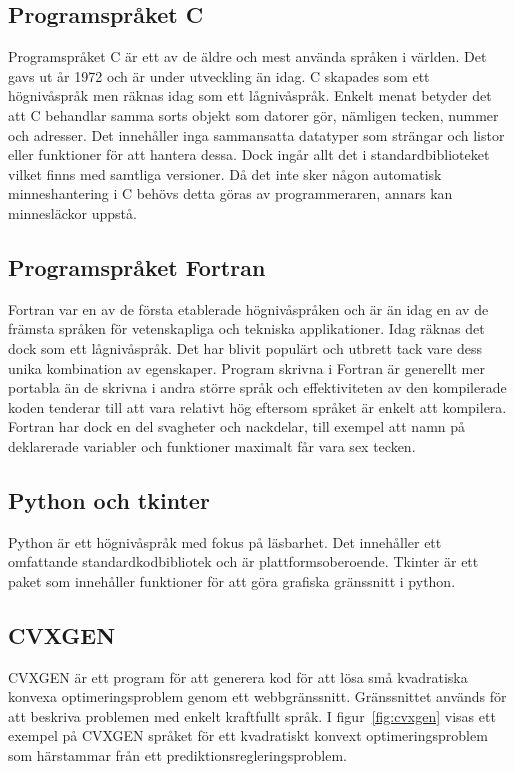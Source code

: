 \subsection{Programspråket C}
Programspråket C är ett av de äldre och mest använda språken i världen. Det gavs ut år 1972 och är under utveckling än idag. C skapades som ett högnivåspråk men räknas idag som ett lågnivåspråk. Enkelt menat betyder det att C behandlar samma sorts objekt som datorer gör, nämligen tecken, nummer och adresser. Det innehåller inga sammansatta datatyper som strängar och listor eller funktioner för att hantera dessa. Dock ingår allt det i standardbiblioteket vilket finns med samtliga versioner. Då det inte sker någon automatisk minneshantering i C behövs detta göras av programmeraren, annars kan minnesläckor uppstå. \citep{cbible}

\subsection{Programspråket Fortran}
Fortran var en av de första etablerade högnivåspråken och är än idag en av de främsta språken för vetenskapliga och tekniska applikationer. Idag räknas det dock som ett lågnivåspråk. Det har blivit populärt och utbrett tack vare dess unika kombination av egenskaper. Program skrivna i Fortran är generellt mer portabla än de skrivna i andra större språk och effektiviteten av den kompilerade koden tenderar till att vara relativt hög eftersom språket är enkelt att kompilera. Fortran har dock en del svagheter och nackdelar, till exempel att namn på deklarerade variabler och funktioner maximalt får vara sex tecken. \citep{fortran}     

\subsection{Python och tkinter}
Python är ett högnivåspråk med fokus på läsbarhet. Det innehåller ett omfattande standardkodbibliotek och är plattformsoberoende. \citep{python}  
\newline
\newline
Tkinter är ett paket som innehåller funktioner för att göra grafiska gränssnitt i python. \citep{tkinter}   

\subsection{CVXGEN}
CVXGEN är ett program för att generera kod för att lösa små kvadratiska konvexa optimeringsproblem genom ett webbgränssnitt. Gränssnittet används för att beskriva problemen med enkelt kraftfullt språk. \citep{cvxgen} \newline
\newline
I figur~\ref{fig:cvxgen} visas ett exempel på CVXGEN språket för ett kvadratiskt konvext optimeringsproblem som härstammar från ett prediktionsregleringsproblem.   

